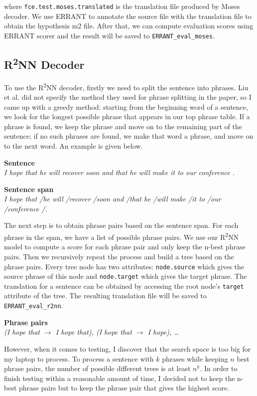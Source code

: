 \documentclass[12pt,a4paper,twoside,openright]{report}
\begin{document}
where \texttt{fce.test.moses.translated} is the translation file produced by Moses decoder. We use ERRANT to annotate the source file with the translation file to obtain the hypothesis m2 file. After that, we can compute evaluation scores using ERRANT scorer and the result will be saved to \texttt{ERRANT\_eval\_moses}.

\subsection{\texorpdfstring{R\textsuperscript{2}NN}{R2NN} Decoder}\label{section:r2nn_test}
To use the R\textsuperscript{2}NN decoder, firstly we need to split the sentence into phrases. Liu et al. did not specify the method they used for phrase splitting in the paper\cite{r2nn}, so I came up with a greedy method: starting from the beginning word of a sentence, we look for the longest possible phrase that appears in our top phrase table. If a phrase is found, we keep the phrase and move on to the remaining part of the sentence; if no such phrases are found, we make that word a phrase, and move on to the next word. An example is given below.

\textbf{Sentence}\\
\textit{I hope that he will recover soon and that he will make it to our conference .}

\textbf{Sentence span}\\
\textit{I hope that /he will /recover /soon and /that he /will make /it to /our /conference /.}

The next step is to obtain phrase pairs based on the sentence span. For each phrase in the span, we have a list of possible phrase pairs. We use our R\textsuperscript{2}NN model to compute a score for each phrase pair and only keep the n-best phrase pairs. Then we recursively repeat the process and build a tree based on the phrase pairs. Every tree node has two attributes: \texttt{node.source} which gives the source phrase of this node and \texttt{node.target} which gives the target phrase. The translation for a sentence can be obtained by accessing the root node's \texttt{target} attribute of the tree. The resulting translation file will be saved to \texttt{ERRANT\_eval\_r2nn}.

\textbf{Phrase pairs}\\
\textit{(I hope that $\rightarrow$ I hope that),
        (I hope that $\rightarrow$ I hope),
        \dots}

However, when it comes to testing, I discover that the search space is too big for my laptop to process. To process a sentence with $k$ phrases while keeping $n$ best phrase pairs, the number of possible different trees is at least $n^k$. In order to finish testing within a reasonable amount of time, I decided not to keep the n-best phrase pairs but to keep the phrase pair that gives the highest score. 
\end{document}
